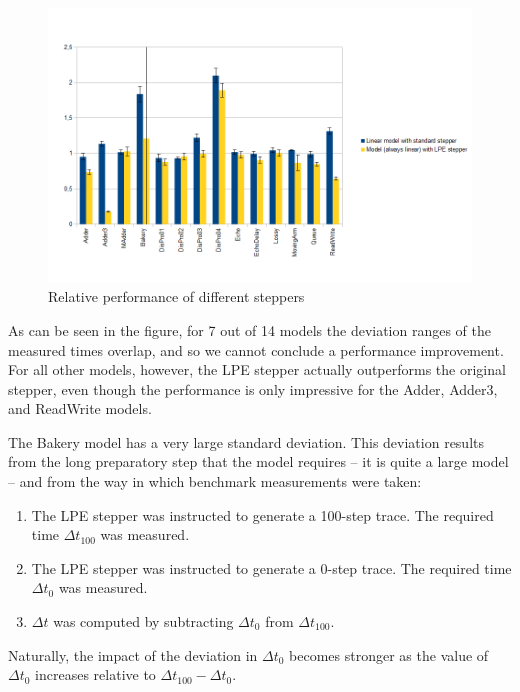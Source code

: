 \begin{figure}[!ht]
\begin{center}
\includegraphics[width=1\linewidth]{charts/steppers-comparison}
\caption{Relative performance of different steppers}
\label{steppers:fig}
\end{center}
\end{figure}

As can be seen in the figure, for 7 out of 14 models the deviation ranges of the measured times overlap, and so we cannot conclude a performance improvement.
For all other models, however, the LPE stepper actually outperforms the original stepper, even though the performance is only impressive for the Adder, Adder3, and ReadWrite models.

The Bakery model has a very large standard deviation.
This deviation results from the long preparatory step that the model requires -- it is quite a large model -- and from the way in which benchmark measurements were taken:
\begin{enumerate}
\item The LPE stepper was instructed to generate a 100-step trace.
The required time $\Delta t _ {100}$ was measured.
\item The LPE stepper was instructed to generate a 0-step trace.
The required time $\Delta t _ {0}$ was measured.
\item $\Delta t$ was computed by subtracting $\Delta t _ {0}$ from $\Delta t _ {100}$.
\end{enumerate}
Naturally, the impact of the deviation in $\Delta t _ {0}$ becomes stronger as the value of $\Delta t _ {0}$ increases relative to $\Delta t _ {100} - \Delta t _ {0}$.

